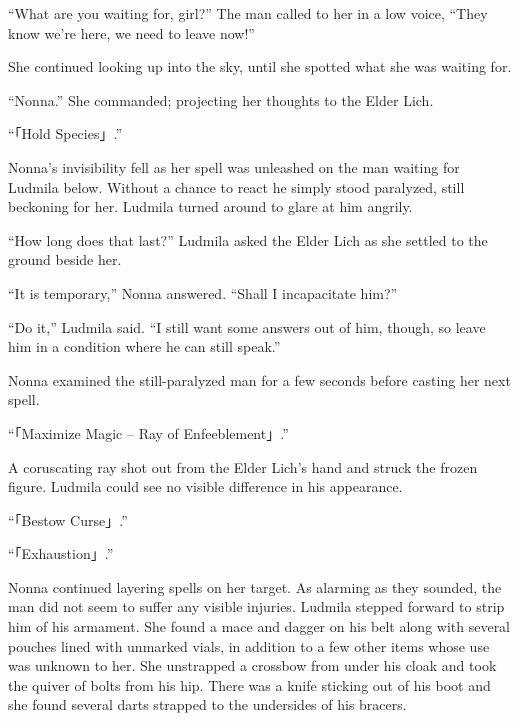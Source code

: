  

“What are you waiting for, girl?” The man called to her in a low voice, “They know we’re here, we need to leave now!”

 

She continued looking up into the sky, until she spotted what she was waiting for.

 

“Nonna.” She commanded; projecting her thoughts to the Elder Lich.

 

“「Hold Species」.”

 

Nonna’s invisibility fell as her spell was unleashed on the man waiting for Ludmila below. Without a chance to react he simply stood paralyzed, still beckoning for her. Ludmila turned around to glare at him angrily.

 

“How long does that last?” Ludmila asked the Elder Lich as she settled to the ground beside her.

 

“It is temporary,” Nonna answered. “Shall I incapacitate him?”

 

“Do it,” Ludmila said. “I still want some answers out of him, though, so leave him in a condition where he can still speak.”

 

Nonna examined the still-paralyzed man for a few seconds before casting her next spell.

 

“「Maximize Magic – Ray of Enfeeblement」.”

 

A coruscating ray shot out from the Elder Lich’s hand and struck the frozen figure. Ludmila could see no visible difference in his appearance.

 

“「Bestow Curse」.”

 

“「Exhaustion」.”

 

Nonna continued layering spells on her target. As alarming as they sounded, the man did not seem to suffer any visible injuries. Ludmila stepped forward to strip him of his armament. She found a mace and dagger on his belt along with several pouches lined with unmarked vials, in addition to a few other items whose use was unknown to her. She unstrapped a crossbow from under his cloak and took the quiver of bolts from his hip. There was a knife sticking out of his boot and she found several darts strapped to the undersides of his bracers.

